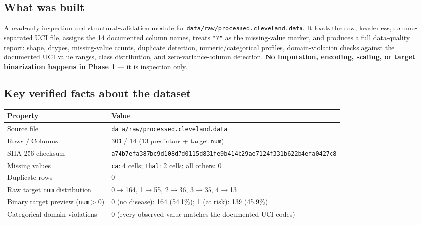 \documentclass[11pt,a4paper]{article}
\newcommand{\code}[1]{\texttt{\small #1}}
\begin{document}
\subsection{What was built}
A read-only inspection and structural-validation module for \code{data/raw/processed.cleveland.data}. It loads the raw, headerless, comma-separated UCI file, assigns the 14 documented column names, treats \code{"?"} as the missing-value marker, and produces a full data-quality report: shape, dtypes, missing-value counts, duplicate detection, numeric/categorical profiles, domain-violation checks against the documented UCI value ranges, class distribution, and zero-variance-column detection. \textbf{No imputation, encoding, scaling, or target binarization happens in Phase 1} --- it is inspection only.

\subsection{Key verified facts about the dataset}

\begin{tabularx}{\textwidth}{@{}p{4.4cm}Y@{}}
\toprule
\textbf{Property} & \textbf{Value} \\
\midrule
Source file & \code{data/raw/processed.cleveland.data} \\
Rows / Columns & 303 / 14 (13 predictors + target \code{num}) \\
SHA-256 checksum & \code{\footnotesize a74b7efa387bc9d108d7d0115d831fe9b414b29ae7124f331b622b4efa0427c8} \\
Missing values & \code{ca}: 4 cells; \code{thal}: 2 cells; all others: 0 \\
Duplicate rows & 0 \\
Raw target \code{num} distribution & 0$\to$164, 1$\to$55, 2$\to$36, 3$\to$35, 4$\to$13 \\
Binary target preview (\code{num}$>$0) & 0 (no disease): 164 (54.1\%); 1 (at risk): 139 (45.9\%) \\
Categorical domain violations & 0 (every observed value matches the documented UCI codes) \\
\bottomrule
\end{tabularx}
\end{document}

